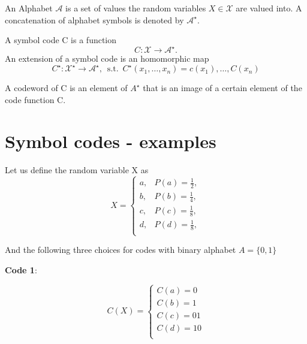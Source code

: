 \begin{definition}[Alphabet]
	An Alphabet $\mathcal{A}$ is a set of values the random variables $X \in \mathcal{X} $ are valued into. A concatenation of alphabet symbols is denoted by $\mathcal{A}^\star$.
\end{definition}

\begin{definition}
	A symbol code C is a function
	$$C: \mathcal{X} \longrightarrow \mathcal{A}^\star.$$ \newline
	An extension of a symbol code is an homomorphic map
	$$C^\star: \mathcal{X}^\star \longrightarrow \mathcal{A}^\star, \,\,\, \text{s.t.} \,\,\, C^\star(x_1, \dots, x_n) = c(x_1), \dots, C(x_n)$$ 
\end{definition}

\begin{definition}[Codeword]
	A codeword of C is an element of $A^\star$ that is an image of a certain element of the code function C. 
\end{definition}

\section{Symbol codes - examples}
Let us define the random variable X as
\begin{equation}
	X = \begin{cases}
		a, &P(a) = \frac{1}{2}, \\
		b, &P(b) = \frac{1}{4}, \\
		c, &P(c) = \frac{1}{8}, \\
		d, &P(d) = \frac{1}{8}, \\
	\end{cases}
\end{equation}

And the following three choices for codes with binary alphabet $A=\{0,1\}$ \newline
\newline

\textbf{Code 1}:

\begin{equation}
C(X) = \begin{cases}
C(a) = 0 \\
C(b) = 1 \\
C(c) = 01 \\
C(d) = 10 \\
\end{cases}
\end{equation}

